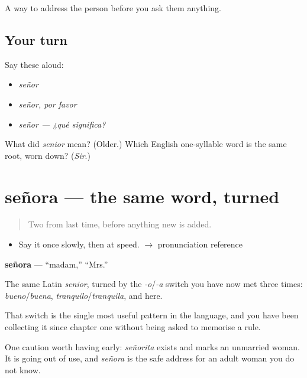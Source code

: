 \begin{grammarlens}[title={What you've built}]
A way to address the person before you ask them anything.
\end{grammarlens}

\subsection*{Your turn}
Say these aloud:

\begin{itemize}
\raggedright
  \item \emph{señor}
  \item \emph{señor, por favor}
  \item \emph{señor — ¿qué significa?}
\end{itemize}

\begin{tcolorbox}[breakable,colback=teal!4,colframe=teal!35!black,title={Before you move on}]
What did \emph{senior} mean? (Older.) Which English one-syllable word is the same root, worn down? (\emph{Sir}.)
\end{tcolorbox}
\section[señora]{señora — the same word, turned}

\label{lesson:ES-C305-senora}



\begin{quote}
Two from last time, before anything new is added.
\end{quote}

\begin{sounds}
\begin{itemize}
\raggedright
  \item Say it once slowly, then at speed. $\to$ pronunciation reference
\end{itemize}
\end{sounds}

\begin{cousinweb}
\textbf{señora} — \textquotedblleft{}madam,\textquotedblright{} \textquotedblleft{}Mrs.\textquotedblright{}

The same Latin \emph{senior}, turned by the \emph{-o}/\emph{-a} switch you have now met three times: \emph{bueno}/\emph{buena}, \emph{tranquilo}/\emph{tranquila}, and here.

That switch is the single most useful pattern in the language, and you have been collecting it since chapter one without being asked to memorise a rule.

One caution worth having early: \emph{señorita} exists and marks an unmarried woman. It is going out of use, and \emph{señora} is the safe address for an adult woman you do not know.
\end{cousinweb}

